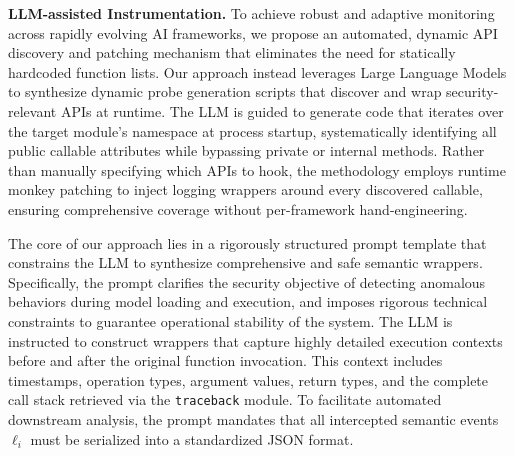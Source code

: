 \noindent \textbf{LLM-assisted Instrumentation.} %
To achieve robust and adaptive monitoring across rapidly evolving AI frameworks, we propose an automated, dynamic API discovery and patching mechanism that eliminates the need for statically hardcoded function lists. Our approach instead leverages Large Language Models to synthesize dynamic probe generation scripts that discover and wrap security-relevant APIs at runtime. The LLM is guided to generate code that iterates over the target module's namespace at process startup, systematically identifying all public callable attributes while bypassing private or internal methods. Rather than manually specifying which APIs to hook, the methodology employs runtime monkey patching to inject logging wrappers around every discovered callable, ensuring comprehensive coverage without per-framework hand-engineering.

The core of our approach lies in a rigorously structured prompt template that constrains the LLM to synthesize comprehensive and safe semantic wrappers. Specifically, the prompt clarifies the security objective of detecting anomalous behaviors during model loading and execution, and imposes rigorous technical constraints to guarantee operational stability of the system. The LLM is instructed to construct wrappers that capture highly detailed execution contexts before and after the original function invocation. This context includes timestamps, operation types, argument values, return types, and the complete call stack retrieved via the \texttt{traceback} module. To facilitate automated downstream analysis, the prompt mandates that all intercepted semantic events $\ell_i$ must be serialized into a standardized JSON format.

